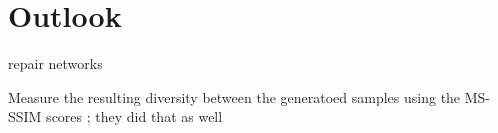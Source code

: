 \section{Outlook}\label{ausblick}


repair networks
\cite{Tanno2022repairingneuralnetworkfromcorrupt}


Measure the resulting diversity between the generatoed samples using the MS-SSIM scores \cite{Odena201710.5555/3305890.3305954}; they did that as well 


\newpage
